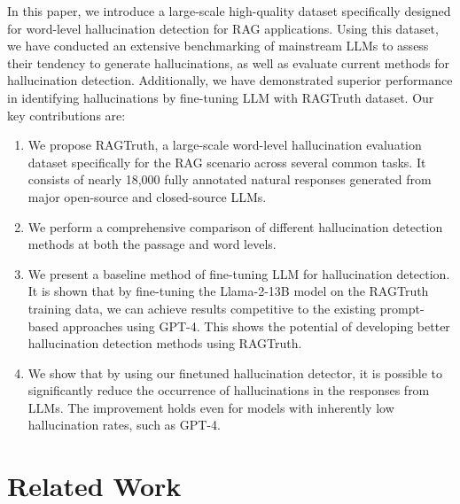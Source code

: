 \documentclass[11pt]{article}
\newcommand{\CorpusName}{RAGTruth}
\begin{document}
In this paper, we introduce a large-scale high-quality dataset specifically designed for word-level hallucination detection for RAG applications. 
Using this dataset, we have conducted an extensive benchmarking of mainstream LLMs to assess their tendency to generate hallucinations, as well as evaluate current methods for hallucination detection. 
Additionally, we have demonstrated superior performance in identifying hallucinations by fine-tuning LLM with {\CorpusName} dataset. 
Our key contributions are:
\begin{enumerate}[label=(\roman*)]
\item We propose {\CorpusName}, a large-scale word-level hallucination evaluation dataset specifically for the RAG scenario across several common tasks. 
It consists of nearly 18,000 fully annotated natural responses generated from major open-source and closed-source LLMs. 
\item We perform a comprehensive comparison of different hallucination detection methods at both the passage and word levels.
\item We present a baseline method of fine-tuning LLM for hallucination detection. 
It is shown that by fine-tuning the Llama-2-13B model on the {\CorpusName} training data, we can achieve results competitive to the existing prompt-based approaches using GPT-4. 
This shows the potential of developing better hallucination detection methods using {\CorpusName}.
\item We show that by using our finetuned hallucination detector, it is possible to significantly reduce the occurrence of hallucinations in the responses from LLMs. The improvement holds even for models with inherently low hallucination rates, such as GPT-4.
\end{enumerate}

\section{Related Work}
\end{document}
